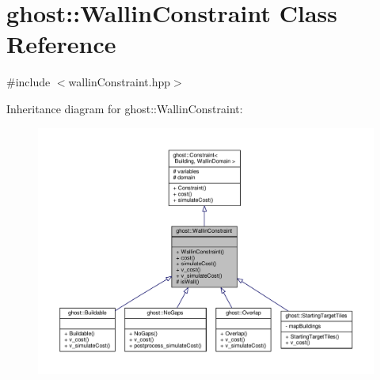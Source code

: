 \hypertarget{classghost_1_1WallinConstraint}{\section{ghost\-:\-:Wallin\-Constraint Class Reference}
\label{classghost_1_1WallinConstraint}
}


{\ttfamily \#include $<$wallin\-Constraint.\-hpp$>$}



Inheritance diagram for ghost\-:\-:Wallin\-Constraint\-:\nopagebreak
\begin{figure}[H]
\begin{center}
\leavevmode
\includegraphics[width=350pt]{classghost_1_1WallinConstraint__inherit__graph}
\end{center}
\end{figure}


